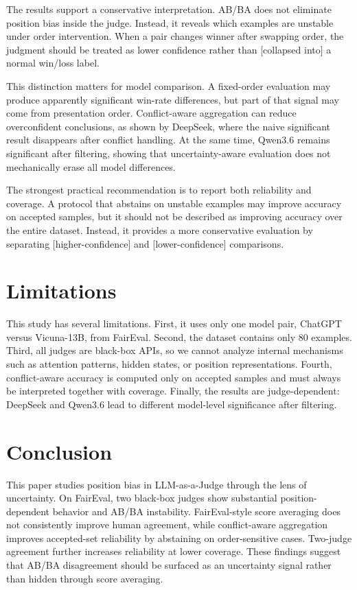 \documentclass[11pt]{article}
\begin{document}
The results support a conservative interpretation. AB/BA does not eliminate position bias inside the judge. Instead, it reveals which examples are unstable under order intervention. When a pair changes winner after swapping order, the judgment should be treated as lower confidence rather than [collapsed into] a normal win/loss label.

This distinction matters for model comparison. A fixed-order evaluation may produce apparently significant win-rate differences, but part of that signal may come from presentation order. Conflict-aware aggregation can reduce overconfident conclusions, as shown by DeepSeek, where the naive significant result disappears after conflict handling. At the same time, Qwen3.6 remains significant after filtering, showing that uncertainty-aware evaluation does not mechanically erase all model differences.

The strongest practical recommendation is to report both reliability and coverage. A protocol that abstains on unstable examples may improve accuracy on accepted samples, but it should not be described as improving accuracy over the entire dataset. Instead, it provides a more conservative evaluation by separating [higher-confidence] and [lower-confidence] comparisons.

\section{Limitations}

This study has several limitations. First, it uses only one model pair, ChatGPT versus Vicuna-13B, from FairEval. Second, the dataset contains only 80 examples. Third, all judges are black-box APIs, so we cannot analyze internal mechanisms such as attention patterns, hidden states, or position representations. Fourth, conflict-aware accuracy is computed only on accepted samples and must always be interpreted together with coverage. Finally, the results are judge-dependent: DeepSeek and Qwen3.6 lead to different model-level significance after filtering.

\section{Conclusion}

This paper studies position bias in LLM-as-a-Judge through the lens of uncertainty. On FairEval, two black-box judges show substantial position-dependent behavior and AB/BA instability. FairEval-style score averaging does not consistently improve human agreement, while conflict-aware aggregation improves accepted-set reliability by abstaining on order-sensitive cases. Two-judge agreement further increases reliability at lower coverage. These findings suggest that AB/BA disagreement should be surfaced as an uncertainty signal rather than hidden through score averaging.
\end{document}
